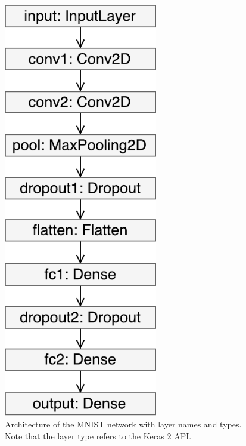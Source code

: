 \begin{figure}
    \begin{minipage}{0.5\textwidth}
        \centering
            \includegraphics[width=0.6\textwidth]{fig/mnist_keras.pdf}
            \caption{Architecture of the MNIST network with layer names and types. Note that the layer type refers to the Keras 2 API.}
            \label{mnist:architecture}
    \end{minipage}
    \begin{minipage}{0.4\textwidth}
        \centering

\end{minipage}
\end{figure}
